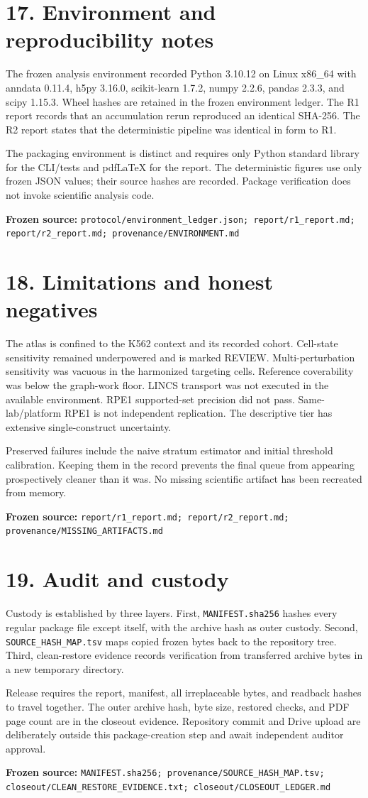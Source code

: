 \documentclass[10pt]{article}
\newcommand{\src}[1]{\par\vfill\noindent\parbox{\linewidth}{\raggedright\sloppy\scriptsize\color{BorderBlue}\textbf{Frozen source:} \texttt{#1}}}
\newcommand{\pg}[2]{\section*{#1}#2}
\begin{document}
\pg{17. Environment and reproducibility notes}{The frozen analysis environment recorded Python 3.10.12 on Linux x86\_64 with anndata 0.11.4, h5py 3.16.0, scikit-learn 1.7.2, numpy 2.2.6, pandas 2.3.3, and scipy 1.15.3. Wheel hashes are retained in the frozen environment ledger. The R1 report records that an accumulation rerun reproduced an identical SHA-256. The R2 report states that the deterministic pipeline was identical in form to R1.\par The packaging environment is distinct and requires only Python standard library for the CLI/tests and pdfLaTeX for the report. The deterministic figures use only frozen JSON values; their source hashes are recorded. Package verification does not invoke scientific analysis code.\src{protocol/environment\_ledger.json; report/r1\_report.md; report/r2\_report.md; provenance/ENVIRONMENT.md}}\newpage

\pg{18. Limitations and honest negatives}{The atlas is confined to the K562 context and its recorded cohort. Cell-state sensitivity remained underpowered and is marked REVIEW. Multi-perturbation sensitivity was vacuous in the harmonized targeting cells. Reference coverability was below the graph-work floor. LINCS transport was not executed in the available environment. RPE1 supported-set precision did not pass. Same-lab/platform RPE1 is not independent replication. The descriptive tier has extensive single-construct uncertainty.\par Preserved failures include the naive stratum estimator and initial threshold calibration. Keeping them in the record prevents the final queue from appearing prospectively cleaner than it was. No missing scientific artifact has been recreated from memory.\src{report/r1\_report.md; report/r2\_report.md; provenance/MISSING\_ARTIFACTS.md}}\newpage

\pg{19. Audit and custody}{Custody is established by three layers. First, \texttt{MANIFEST.sha256} hashes every regular package file except itself, with the archive hash as outer custody. Second, \texttt{SOURCE\_HASH\_MAP.tsv} maps copied frozen bytes back to the repository tree. Third, clean-restore evidence records verification from transferred archive bytes in a new temporary directory.\par Release requires the report, manifest, all irreplaceable bytes, and readback hashes to travel together. The outer archive hash, byte size, restored checks, and PDF page count are in the closeout evidence. Repository commit and Drive upload are deliberately outside this package-creation step and await independent auditor approval.\src{MANIFEST.sha256; provenance/SOURCE\_HASH\_MAP.tsv; closeout/CLEAN\_RESTORE\_EVIDENCE.txt; closeout/CLOSEOUT\_LEDGER.md}}\newpage
\end{document}
